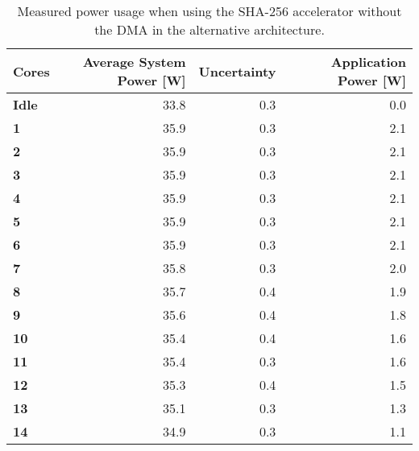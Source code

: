 \begin{appendix}
\begin{table}
\centering
\begin{tabular}{| l | r | r || r |}
  \hline 
  \textbf{Cores} & \textbf{Average System Power [W]} & \textbf{Uncertainty} & \textbf{Application Power [W]} \\
  \hline                           
  \textbf{Idle} & 33.8 & 0.3 & 0.0\\
  \textbf{1} & 35.9 & 0.3 & 2.1\\
  \textbf{2} & 35.9 & 0.3 & 2.1\\
  \textbf{3} & 35.9 & 0.3 & 2.1\\
  \textbf{4} & 35.9 & 0.3 & 2.1\\
  \textbf{5} & 35.9 & 0.3 & 2.1\\
  \textbf{6} & 35.9 & 0.3 & 2.1\\
  \textbf{7} & 35.8 & 0.3 & 2.0\\
  \textbf{8} & 35.7 & 0.4 & 1.9\\
  \textbf{9} & 35.6 & 0.4 & 1.8\\
  \textbf{10} & 35.4 & 0.4 & 1.6\\
  \textbf{11} & 35.4 & 0.3 & 1.6\\
  \textbf{12} & 35.3 & 0.4 & 1.5\\
  \textbf{13} & 35.1 & 0.3 & 1.3\\
  \textbf{14} & 34.9 & 0.3 & 1.1\\
  \hline 
\end{tabular}
\caption{Measured power usage when using the SHA-256 accelerator without the DMA in the alternative architecture.}
\label{tab:SHA-power2}
\end{table}


\end{appendix}
